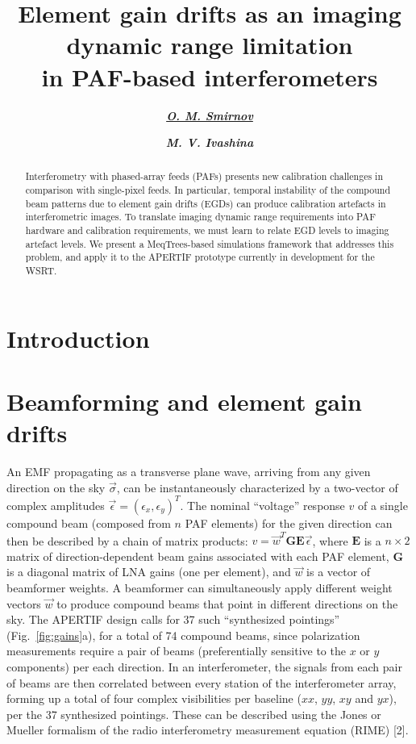 \documentclass{aps2010} \special{papersize=8.5in,11in}
\title{Element gain drifts as an imaging dynamic range limitation\\in PAF-based
interferometers}
\author[org1]{\textbf{\underline{\emph{O. M. Smirnov}}}}
\author[org2]{\textbf{\emph{M. V. Ivashina}}}
\begin{document}
\maketitleblock

\begin{abstract}
Interferometry with phased-array feeds (PAFs) presents new calibration challenges in comparison with single-pixel feeds. In particular, temporal instability of the compound beam patterns due to element gain drifts (EGDs) can produce calibration artefacts in interferometric images. To translate imaging dynamic range requirements into PAF hardware and calibration requirements, we must learn to relate EGD levels to imaging artefact levels. We present a MeqTrees-based simulations framework that addresses this problem, and apply it to the APERTIF prototype currently in development for the WSRT.
\end{abstract}

\section{Introduction}


\section{Beamforming and element gain drifts}

An EMF propagating as a transverse plane wave, arriving from any given direction on the sky $\vec\sigma$, can be 
instantaneously characterized by a two-vector of complex amplitudes $\vec \epsilon = (\epsilon_x,\epsilon_y)^T$. The nominal ``voltage'' response $v$ of a single compound beam (composed from $n$ PAF elements) for the given direction can then be described by a chain of matrix products: $v=\vec w^T \mathbf{G} \mathbf{E} \vec\epsilon$, where $\mathbf{E}$ is a $n\times2$ matrix of direction-dependent beam gains associated with each PAF element, $\mathbf{G}$ is a diagonal matrix of LNA gains (one per element), and $\vec w$ is a vector of beamformer weights. A beamformer can simultaneously apply different weight vectors $\vec w$ to produce compound beams that point in different directions on the sky. The APERTIF design calls for 37 such ``synthesized pointings''
(Fig.~\ref{fig:gains}a), for a total of 74 compound beams, since polarization measurements require a pair of beams (preferentially sensitive to the $x$ or $y$ components) per each direction. In an interferometer, the signals from each pair of beams are then correlated between every station of the interferometer array, forming up a total of four complex visibilities per baseline ($xx$, $yy$, $xy$ and $yx$), per the 37 synthesized pointings. These can be described using the Jones or Mueller formalism of the radio interferometry measurement equation (RIME) [2].
\end{document}
